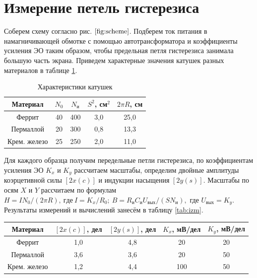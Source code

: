 \documentclass[a4paper,12pt]{article} %
\begin{document}
\section{Измерение петель гистерезиса}

Соберем схему согласно рис. $\ref{fig:scheme}$. Подберем ток питания в намагничивающей обмотке с помощью автотрансформатора и коэффициенты усиления ЭО таким образом, чтобы предельная петля гистерезиса занимала большую часть экрана. Приведем характерные значения катушек разных материалов в таблице \ref{tab:har_kat}.

\begin{table}[H]
	\centering
	\begin{tabular}{|c|c|c|c|c|}
		\hline
		Материал     & $N_0$ & $N_\text{и}$ & $S^2$, см$^2$ & $2\pi R$, см \\ \hline
		Феррит       & 40    & 400                              & 3,0           & 25,0         \\ \hline
		Пермаллой    & 20    & 300                              & 0,8           & 13,3         \\ \hline
		Крем. железо & 25    & 250                              & 2,0           & 11,0         \\ \hline
	\end{tabular}
	\caption{Характеристики катушек}
	\label{tab:har_kat}
\end{table}

Для каждого образца получим передельные петли гистерезиса, по коэффициентам усиления ЭО $K_x$ и $K_y$ рассчитаем масштабы, определим двойные амплитуды коэрцетивной силы $ [2x(c)] $ и индукции насыщения $ [2y(s)] $. Масштабы по осям $ X $ и $ Y $ рассчитаем по формулам 
$H=IN_0/(2\pi R),\ где\ I=K_x/R_0;\ B=R_\text{и}C_\text{и}U_{\text{вых}}/(SN_\text{и}),$ где $U_{\text{вых}}=K_y$. Результаты измерений и вычислений занесём в таблицу \ref{tab:izm}.

\begin{table}[H]
	\centering
	\begin{tabular}{|c|c|c|c|c|}
		\hline
		Материал     & $[2x(c)]$, дел & $[2y(s)]$, дел & $K_x$, мВ/дел & $K_y$, мВ/дел \\ \hline
		Феррит       & 1,0            & 4,8            & 20            & 20            \\ \hline
		Пермаллой    & 3,6            & 3,6            & 20            & 50            \\ \hline
		Крем. железо & 1,2            & 4,4            & 100           & 50            \\ \hline
	\end{tabular}
\end{table}
\end{document}
